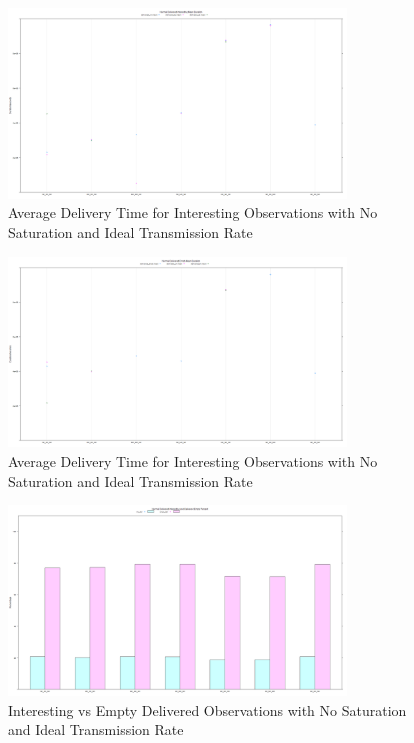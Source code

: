 	\begin{figure}[h]
	\centering
	\includegraphics[width=0.8\textwidth]{Chap7/figures/plots/normal_ideal/tpvsfp_delivered.png}
	\caption{Average Delivery Time for Interesting Observations with No Saturation and Ideal Transmission Rate}
	\label{fig:sim:res:norm:ideal:tpfp}
	\end{figure}

	\begin{figure}[h]
	\centering
	\includegraphics[width=0.8\textwidth]{Chap7/figures/plots/normal_ideal/tnvsfn_delivered.png}
	\caption{Average Delivery Time for Interesting Observations with No Saturation and Ideal Transmission Rate}
	\label{fig:sim:res:norm:ideal:tnfn}
	\end{figure}

	\begin{figure}[h]
	\centering
	\includegraphics[width=0.8\textwidth]{Chap7/figures/plots/normal_ideal/intdelvemptdel_percent.png}
	\caption{Interesting vs Empty Delivered Observations with No Saturation and Ideal Transmission Rate}
	\label{fig:sim:res:norm:ideal:intempt}
	\end{figure}



